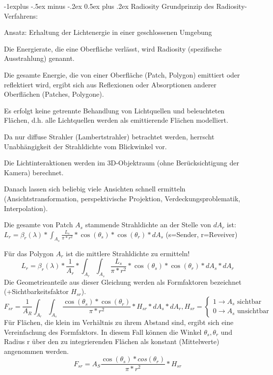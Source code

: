 \documentclass[landscape]{article}
\makeatletter
\renewcommand{\subsection}{\@startsection{subsection}{2}{0mm}%
                                {-1explus -.5ex minus -.2ex}%
                                {0.5ex plus .2ex}%
                                {\normalfont\normalsize\bfseries}}
\makeatother
\begin{document}
\begin{multicols}{3}
  \subsection{ Radiosity}
  Grundprinzip des Radiosity-Verfahrens:
  \begin{itemize*}
    \item Ansatz: Erhaltung der Lichtenergie in einer geschlossenen Umgebung
    \item Die Energierate, die eine Oberfläche verlässt, wird Radiosity (spezifische Ausstrahlung) genannt.
    \item Die gesamte Energie, die von einer Oberfläche (Patch, Polygon) emittiert oder reflektiert wird, ergibt sich aus Reflexionen oder Absorptionen anderer Oberflächen (Patches, Polygone).
    \item Es erfolgt keine getrennte Behandlung von Lichtquellen und beleuchteten Flächen, d.h. alle Lichtquellen werden als emittierende Flächen modelliert.
    \item Da nur diffuse Strahler (Lambertstrahler) betrachtet werden, herrscht Unabhängigkeit der Strahldichte vom Blickwinkel vor.
    \item Die Lichtinteraktionen werden im 3D-Objektraum (ohne Berücksichtigung der Kamera) berechnet.
    \item Danach lassen sich beliebig viele Ansichten schnell ermitteln (Ansichtstransformation, perspektivische Projektion, Verdeckungsproblematik, Interpolation).
  \end{itemize*}
  
  Die gesamte von Patch $A_s$ stammende Strahldichte an der Stelle von $dA_r$ ist: $L_r=\beta_r(\lambda)*\int_{A_s}\frac{L_s}{\pi * r^2}*\cos(\theta_s)*\cos(\theta_r)*dA_s$ (s=Sender, r=Reveiver)
  
  Für das Polygon $A_r$ ist die mittlere Strahldichte zu ermitteln!
  $$L_r=\beta_r(\lambda)*\frac{1}{A_r}*\int_{A_r}\int_{A_s}\frac{L_s}{\pi*r^2}*\cos(\theta_s)*\cos(\theta_r)*dA_s*dA_r$$
  Die Geometrieanteile aus dieser Gleichung werden als Formfaktoren bezeichnet (+Sichtbarkeitsfaktor $H_{sr}$).
  $$F_{sr}=\frac{1}{A_R}\int_{A_r}\int_{A_s}\frac{\cos(\theta_s)*\cos(\theta_r)}{\pi*r^2}*H_{sr}*dA_s*dA_r, H_{sr}=\begin{cases}1\rightarrow A_s \text{ sichtbar}\\ 0\rightarrow A_s \text{ unsichtbar}\end{cases}$$
  Für Flächen, die klein im Verhältnis zu ihrem Abstand sind, ergibt sich eine Vereinfachung des Formfaktors. In diesem Fall können die Winkel $\theta_s,\theta_r$ und Radius r über den zu integrierenden Flächen als konstant (Mittelwerte) angenommen werden.
  $$F_{sr}=A_S \frac{\cos(\theta_s)*cos(\theta_r)}{\pi*r^2}*H_{sr}$$
  

\end{multicols}
\end{document}
